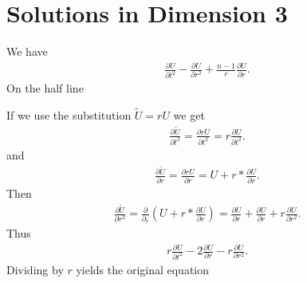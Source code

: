 \section{Solutions in Dimension 3}
\begin{Definition}
  We have 
  \begin{align*}
    \frac{\partial U}{\partial t^2}  - \frac{\partial U}{\partial r^2}  + \frac{n-1}{r} \frac{\partial U}{\partial r} 
  .\end{align*}
  On the half line
\end{Definition}
\begin{corollary}
 If we use the substitution $\tilde{U} = rU $  we get 
 \begin{align*}
  \frac{\partial \tilde{U} }{\partial t^2}  =  \frac{\partial rU }{\partial t^2} = r \frac{\partial U}{\partial t^2}
 .\end{align*}
 and 
 \begin{align*}
  \frac{\partial \tilde{U } }{\partial r} = \frac{\partial rU}{\partial r}  = U  + r*\frac{\partial U}{\partial r} 
 .\end{align*}
 Then
 \begin{align*}
  \frac{\partial \tilde{U } }{\partial r^2} =\frac{\partial}{\partial_r} (U+r*\frac{\partial U}{\partial r})  = \frac{\partial U}{\partial r} + \frac{\partial U}{\partial r}  + r \frac{\partial U}{\partial r^2} 
 .\end{align*}
 Thus 
 \begin{align*}
  r \frac{\partial U}{\partial t^2} -  2\frac{\partial U}{\partial r}  - r \frac{\partial U}{\partial r^2}
 .\end{align*}
 Dividing by $r$ yields the original equation
\end{corollary}
